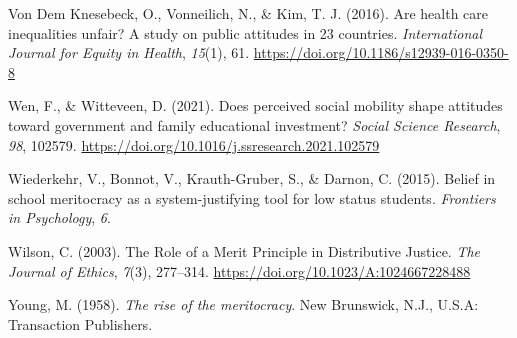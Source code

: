 \documentclass[
  13pt,
]{article}
\newlength{\cslhangindent}
\newenvironment{CSLReferences}[2] %
 {\begin{list}{}{%
  \setlength{\itemindent}{0pt}
  \setlength{\leftmargin}{0pt}
  \setlength{\parsep}{0pt}
  \ifodd #1
   \setlength{\leftmargin}{\cslhangindent}
   \setlength{\itemindent}{-1\cslhangindent}
  \fi
  \setlength{\itemsep}{#2\baselineskip}}}
 {\end{list}}
\begin{document}
\begin{CSLReferences}{1}{0}
Von Dem Knesebeck, O., Vonneilich, N., \& Kim, T. J. (2016). Are health
care inequalities unfair? {A} study on public attitudes in 23 countries.
\emph{International Journal for Equity in Health}, \emph{15}(1), 61.
\url{https://doi.org/10.1186/s12939-016-0350-8}

Wen, F., \& Witteveen, D. (2021). Does perceived social mobility shape
attitudes toward government and family educational investment?
\emph{Social Science Research}, \emph{98}, 102579.
\url{https://doi.org/10.1016/j.ssresearch.2021.102579}

Wiederkehr, V., Bonnot, V., Krauth-Gruber, S., \& Darnon, C. (2015).
Belief in school meritocracy as a system-justifying tool for low status
students. \emph{Frontiers in Psychology}, \emph{6}.

Wilson, C. (2003). The {Role} of a {Merit Principle} in {Distributive
Justice}. \emph{The Journal of Ethics}, \emph{7}(3), 277--314.
\url{https://doi.org/10.1023/A:1024667228488}

Young, M. (1958). \emph{The rise of the meritocracy}. New Brunswick,
N.J., U.S.A: Transaction Publishers.

\end{CSLReferences}
\end{document}
